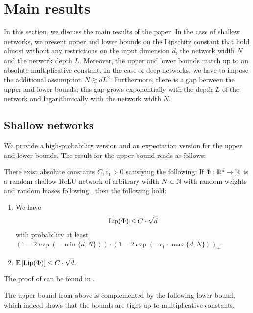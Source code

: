 
\section{Main results}\label{sec:mainresults}


In this section, we discuss the main results of the paper.
In the case of shallow networks, we present upper and lower bounds on the Lipschitz constant
that hold almost without any restrictions on the input dimension $d$,
the network width $N$ and the network depth $L$.
Moreover, the upper and lower bounds match up to an absolute multiplicative constant.
In the case of deep networks, we have to impose the additional assumption $N \gtrsim d L^2$. 
Furthermore, there is a gap between the upper and lower bounds;
this gap grows exponentially with the depth $L$ of the network
and logarithmically with the network width $N$.
\subsection{Shallow networks}

We provide a high-probability version and an expectation version for the upper and lower bounds. 
The result for the upper bound reads as follows:

\begin{theorem}\label{thm:main_1}
  There exist absolute constants $C, c_1>0$ satisfying the following:
  If $\Phi: \mathbb{R}^d \to \mathbb{R}$ is a random shallow ReLU network of arbitrary width $N \in \mathbb{N}$
  with random weights and random biases following , then the following hold:
  \begin{enumerate}
    \item We have
          \begin{align*}
            \operatorname{Lip}(\Phi) \leq C \cdot \sqrt{d} 
          \end{align*}
          with probability at least $(1-2\exp(-\min\{d,N\})) \cdot (1-2\exp(-c_1 \cdot \max\{d,N\}))_+$.
    
    \item $\displaystyle \mathbb{E} \left[\operatorname{Lip}(\Phi) \right] \leq C  \cdot \sqrt{d}.$
  \end{enumerate}
\end{theorem}

The proof of  can be found in .
 
The upper bound from above is complemented by the following lower bound,
which indeed shows that the bounds are tight up to multiplicative constants.

